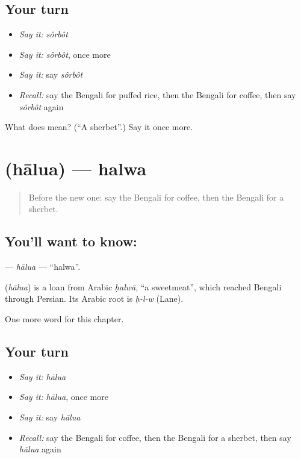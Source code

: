 \subsection*{Your turn}
\begin{itemize}
\raggedright
  \item \emph{Say it:} \emph{sôrbôt}
  \item \emph{Say it:} \emph{sôrbôt}, once more
  \item \emph{Say it:} say \emph{sôrbôt}
  \item \emph{Recall:} say the Bengali for puffed rice, then the Bengali for coffee, then say \emph{sôrbôt} again
\end{itemize}

\begin{tcolorbox}[breakable,colback=teal!4,colframe=teal!35!black,title={Before you move on}]
What does  mean? (\textquotedblleft{}A sherbet\textquotedblright{}.) Say it once more.
\end{tcolorbox}
\section[\texorpdfstring{\bn{হালুয়া} (hālua)}{হালুয়া (hālua)}]{ (hālua) — halwa}

\label{lesson:BN-C119-halua}



\begin{quote}
Before the new one: say the Bengali for coffee, then the Bengali for a sherbet.
\end{quote}

\subsection*{You'll want to know: }
\textbf{} — \emph{hālua} — \textquotedblleft{}halwa\textquotedblright{}.

\begin{cousinweb}
\textbf{} (\emph{hālua}) is a loan from Arabic \emph{ḥalwā}, \textquotedblleft{}a sweetmeat\textquotedblright{}, which reached Bengali through Persian. Its Arabic root is \emph{ḥ-l-w} (Lane).
\end{cousinweb}

\begin{grammarlens}[title={What you've built}]
One more word for this chapter.
\end{grammarlens}

\subsection*{Your turn}
\begin{itemize}
\raggedright
  \item \emph{Say it:} \emph{hālua}
  \item \emph{Say it:} \emph{hālua}, once more
  \item \emph{Say it:} say \emph{hālua}
  \item \emph{Recall:} say the Bengali for coffee, then the Bengali for a sherbet, then say \emph{hālua} again
\end{itemize}


